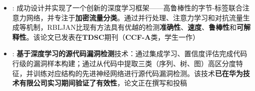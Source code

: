 \documentclass[zh]{resume}
\begin{document}
{}
\vspace{-0.2cm}
\begin{itemize}
  \item {}:
    成功设计并实现了一个创新的深度学习框架——高鲁棒性的字节-标签联合注意力网络，并专注于\textbf{加密流量分类}。通过并行处理、注意力学习和对抗流量生成等机制，RBLJAN比现有方法具有优越的检测\textbf{准确性}、\textbf{速度}、\textbf{鲁棒性}和\textbf{可解释性}。该论文已发表在\textbf{TDSC}期刊（\textbf{CCF-A}类，学生一作）
    {\scriptsize{}}
  \item {}:
    \textbf{基于深度学习的源代码漏洞检测}技术：通过集成学习、置信度评估完成代码行级的漏洞样本构建；通过从代码中提取三类（序列、树、图）高区分度特征，并训练对应结构的先进神经网络进行源代码漏洞检测。该技术\textbf{已在华为技术有限公司实习期间验证了有效性}，论文正在撰写和投稿
    {\hspace{.5em}\scriptsize{}}
\end{itemize}
\vspace{-0.1cm}
{}
\vspace{-0.2cm}
\end{document}
